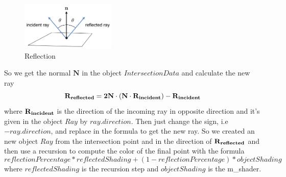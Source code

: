 \documentclass[10pt,a4paper]{report}
\begin{document}
\begin{figure}[h!]
\caption{Reflection}
  \centering
    \includegraphics[width=0.4\textwidth]{recuRay.png}
\end{figure}

So we get the normal $\mathbf{N}$ in the object $IntersectionData$ and calculate the new ray $$\mathbf{R_{reflected} = 2 \mathbf{N} \cdot \bf (N \cdot R_{incident}) - R_{incident}}$$ where $\bf R_{incident}$ is the direction of the incoming ray in opposite direction and it's given in the object $Ray$ by $ray.direction$. Then just change the sign, i.e $-ray.direction$, and replace in the formula to get the new ray. So we created an new object $Ray$ from the intersection point and in the direction of $\bf R_{reflected}$ and then use a recursion to compute the color of the final point with the formula $$ reflectionPercentage * reflectedShading + (1 - reflectionPercentage) * objectShading $$ where $reflectedShading$ is the recursion step and $objectShading$ is the m\_shader.
\end{document}

